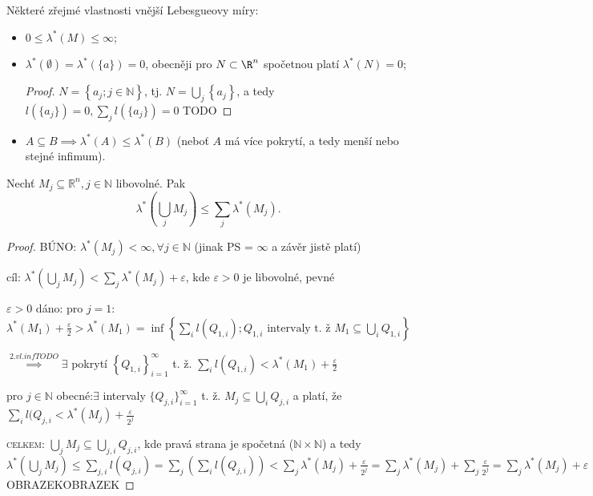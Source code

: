 \begin{poznamka}
    Některé zřejmé vlastnosti vnější Lebesgueovy míry:
    \begin{itemize}
        \item $0\leq \lambda^*(M)\leq \infty$;
        \item $\lambda^*(\emptyset)=\lambda^*(\{a\})=0$, obecněji pro $N\subset\R^n$ spočetnou platí $\lambda^*(N)=0$;
            \begin{proof}
                $N=\left\{a_j; j \in \mathbb N\right\}$, tj. $N=\bigcup_j \left\{a_j\right\}$, a tedy $l(\{a_j\})=0, \sum_j l(\{a_j\})=0$ TODO
            \end{proof}
        \item $A \subseteq B\implies \lambda^*(A)\leq \lambda^*(B)$ (neboť $A$ má více pokrytí, a tedy menší nebo stejné infimum).
    \end{itemize}
\end{poznamka}

\begin{veta}
    Nechť $M_j \subseteq \mathbb R^n, j \in \mathbb N$ libovolné. Pak
    $$\lambda^*\left(\bigcup_j M_j\right)\leq \sum_{j} \lambda^*\left(M_j\right).$$
\end{veta}

\begin{proof}
    BÚNO: $\lambda^*(M_j)<\infty, \forall j \in \mathbb N$ (jinak PS = $\infty$ a závěr jistě platí)

    cíl: $\lambda^*\left(\bigcup_j M_j\right)<\sum_{j} \lambda^*(M_j)+\varepsilon$, kde $\varepsilon>0$ je libovolné, pevné

    $\varepsilon>0$ dáno: pro $j=1$: $\lambda^*(M_1)+\frac{\varepsilon}{2}>\lambda^*(M_1)= \inf\left\{\sum_{i} l(Q_{1,i});Q_{1,i} \text{ intervaly t. ž } M_1 \subseteq \bigcup_i Q_{1,i}\right\}$

   $\stackrel{2. vl. inf TODO}{\implies}\exists$ pokrytí $\left\{Q_{1,i}\right\}_{i=1}^\infty$ t. ž. $\sum_{i} l\left(Q_{1,i}\right)<\lambda^*(M_1)+\frac{\varepsilon}{2}$
    
    pro $j\in \mathbb N$ obecné:$\exists$ intervaly $\{Q_{j, i}\}_{i=1}^\infty$ t. ž. $M_j \subseteq \bigcup_i Q_{j, i}$ a platí, že $\sum_i l(Q_{j, i}<\lambda^*(M_j)+\frac{\varepsilon}{2^j}$

    \textsc{celkem}: $\bigcup_j M_j \subseteq \bigcup_{j, i} Q_{j,i}$, kde pravá strana je spočetná ($\mathbb N \times \mathbb N$) a tedy $\lambda^*\left(\bigcup_j M_j\right)\leq \sum_{j, i} l(Q_{j,i})=\sum_j\left(\sum_i l\left(Q_{j,i}\right)\right)<\sum_j \lambda^*(M_j)+\frac{\varepsilon}{2^j}= \sum_j \lambda^*(M_j)+\sum_j \frac{\varepsilon}{2^j} = \sum_j \lambda^*(M_j)+\varepsilon$
    OBRAZEKOBRAZEK
\end{proof}

